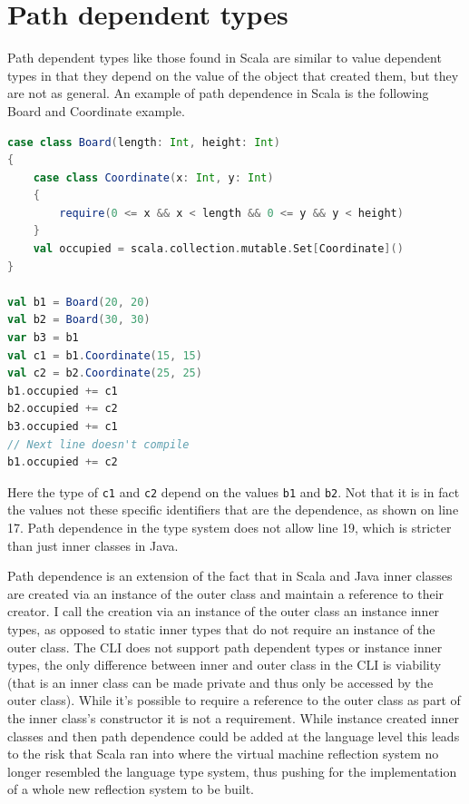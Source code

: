 \documentclass[english]{report}
\begin{document}
\section{Path dependent types\label{sec:Path-dependent-types}}

Path dependent types like those found in Scala are similar to value
dependent types in that they depend on the value of the object that
created them, but they are not as general. An example of path dependence
in Scala is the following Board and Coordinate example\cite{stack-2693067}.

\begin{lstlisting}[keywordstyle={\color{blue}},language=scala]
case class Board(length: Int, height: Int) 
{   
	case class Coordinate(x: Int, y: Int) 
	{      
		require(0 <= x && x < length && 0 <= y && y < height)    
	}   
	val occupied = scala.collection.mutable.Set[Coordinate]() 
}

val b1 = Board(20, 20) 
val b2 = Board(30, 30)
var b3 = b1
val c1 = b1.Coordinate(15, 15) 
val c2 = b2.Coordinate(25, 25) 
b1.occupied += c1 
b2.occupied += c2
b3.occupied += c1
// Next line doesn't compile 
b1.occupied += c2
\end{lstlisting}


Here the type of \texttt{c1} and \texttt{c2} depend on the values
\texttt{b1} and \texttt{b2}. Not that it is in fact the values not
these specific identifiers that are the dependence, as shown on line
17. Path dependence in the type system does not allow line 19, which
is stricter than just inner classes in Java. 

Path dependence is an extension of the fact that in Scala and Java
inner classes are created via an instance of the outer class and maintain
a reference to their creator. I call the creation via an instance
of the outer class an instance inner types, as opposed to static inner
types that do not require an instance of the outer class. The CLI
does not support path dependent types or instance inner types, the
only difference between inner and outer class in the CLI is viability
(that is an inner class can be made private and thus only be accessed
by the outer class). While it's possible to require a reference to
the outer class as part of the inner class's constructor it is not
a requirement. While instance created inner classes and then path
dependence could be added at the language level this leads to the
risk that Scala ran into where the virtual machine reflection system
no longer resembled the language type system, thus pushing for the
implementation of a whole new reflection system to be built. 
\end{document}

